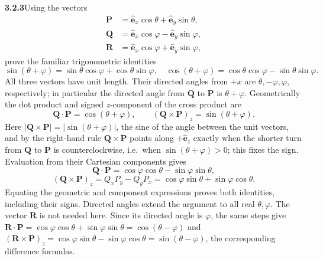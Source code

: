 \par\bigskip
\noindent\textbf{3.2.3}\quad Using the vectors
\[
\begin{split}
\mathbf{P}&=\hat{\mathbf{e}}_{x}\cos\theta+\hat{\mathbf{e}}_{y}\sin\theta,\\
\mathbf{Q}&=\hat{\mathbf{e}}_{x}\cos\varphi-\hat{\mathbf{e}}_{y}\sin\varphi,\\
\mathbf{R}&=\hat{\mathbf{e}}_{x}\cos\varphi+\hat{\mathbf{e}}_{y}\sin\varphi,
\end{split}
\]
prove the familiar trigonometric identities
\[
\sin(\theta+\varphi)=\sin\theta\cos\varphi+\cos\theta\sin\varphi,\quad
\cos(\theta+\varphi)=\cos\theta\cos\varphi-\sin\theta\sin\varphi.
\]
\solution
All three vectors have unit length. Their directed angles from $+x$ are
$\theta,-\varphi,\varphi$, respectively; in particular the directed
angle from $\mathbf Q$ to $\mathbf P$ is $\theta+\varphi$.
Geometrically the dot product and signed $z$-component of the cross
product are
\[
\mathbf Q\cdot\mathbf P=\cos(\theta+\varphi),\qquad
(\mathbf Q\times\mathbf P)_z=\sin(\theta+\varphi).
\]
Here $|\mathbf Q\times\mathbf P|=|\sin(\theta+\varphi)|$, the sine of
the angle between the unit vectors, and by the right-hand rule
$\mathbf Q\times\mathbf P$ points along $+\hat{\mathbf e}_z$ exactly when
the shorter turn from $\mathbf Q$ to $\mathbf P$ is counterclockwise,
i.e.\ when $\sin(\theta+\varphi)>0$; this fixes the sign.
Evaluation from their Cartesian components gives
\[
\mathbf Q\cdot\mathbf P=\cos\varphi\cos\theta-\sin\varphi\sin\theta,
\]
\[
(\mathbf Q\times\mathbf P)_z
=Q_xP_y-Q_yP_x
=\cos\varphi\sin\theta+\sin\varphi\cos\theta.
\]
Equating the geometric and component expressions proves both identities,
including their signs. Directed angles extend the argument to all real
$\theta,\varphi$.
The vector $\mathbf R$ is not needed here. Since its directed angle is
$\varphi$, the same steps give
$\mathbf R\cdot\mathbf P=\cos\varphi\cos\theta+\sin\varphi\sin\theta
=\cos(\theta-\varphi)$ and
$(\mathbf R\times\mathbf P)_z=\cos\varphi\sin\theta-\sin\varphi\cos\theta
=\sin(\theta-\varphi)$, the corresponding difference formulas.


